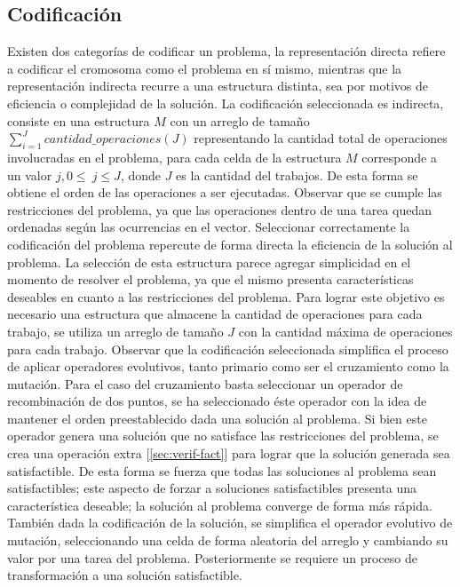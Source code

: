 \documentclass[journal]{IEEEtran}
\begin{document}
\subsection{Codificación}
Existen dos categorías de codificar un problema, la representación directa \cite{url:rep}\cite{url:repdirecta} refiere a codificar el cromosoma como el problema en sí mismo, mientras que la representación indirecta recurre a una estructura distinta, sea por motivos de eficiencia o complejidad de la solución.
La codificación seleccionada es indirecta, consiste en una estructura $M$ con un arreglo de tamaño $\sum_{i=1}^{J} cantidad\_operaciones(J)$ representando la cantidad total de operaciones involucradas en el problema, para cada celda de la estructura $M$ corresponde a un valor $j, 0\leq\ j \leq J$, donde $J$ es la cantidad del trabajos. De esta forma se obtiene el orden de las operaciones a ser ejecutadas. Observar que se cumple las restricciones del problema, ya que las operaciones dentro de una tarea quedan ordenadas según las ocurrencias en el vector.
Seleccionar correctamente la codificación del problema repercute de forma directa la eficiencia de la solución al problema. La selección de esta estructura parece agregar simplicidad en el momento de resolver el problema, ya que el mismo presenta características deseables en cuanto a las restricciones del problema. Para lograr este objetivo es necesario una estructura que almacene la cantidad de operaciones para cada trabajo, se utiliza un arreglo de tamaño $J$ con la cantidad máxima de operaciones para cada trabajo.
Observar que la codificación seleccionada simplifica el proceso de aplicar operadores evolutivos, tanto primario como ser el cruzamiento como la mutación. Para el caso del cruzamiento basta seleccionar un operador de recombinación de dos puntos, se ha seleccionado éste operador con la idea de mantener el orden preestablecido dada una solución al problema. Si bien este operador genera una solución que no satisface las restricciones del problema, se crea una operación extra [\ref{sec:verif-fact}] para lograr que la solución generada sea satisfactible. De esta forma se fuerza que todas las soluciones al problema sean satisfactibles; este aspecto de forzar a soluciones satisfactibles presenta una característica deseable; la solución al problema converge de forma más rápida.\cite{url:binaria}
También dada la codificación de la solución, se simplifica el operador evolutivo de mutación, seleccionando una celda de forma aleatoria del arreglo y cambiando su valor por una tarea del problema. Posteriormente se requiere un proceso de transformación a una solución satisfactible.
\end{document}
